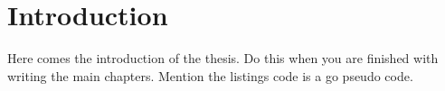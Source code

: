 \chapter*{Introduction}
{}

Here comes the introduction of the thesis. Do this when you are finished with writing the main chapters.
Mention the listings code is a go pseudo code.